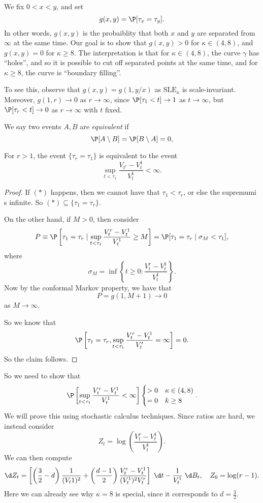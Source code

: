\documentclass[a4paper]{article}
\newcommand\SLE{\mathrm{SLE}}
\begin{document}
We fix $0 < x < y$, and set
\[
  g(x, y) =\P[\tau_x = \tau_y].
\]
In other words, $g(x, y)$ is the probaiblity that both $x$ and $y$ are separated from $\infty$ at the same time. Our goal is to show that $g(x, y) > 0$ for $\kappa \in (4, 8)$, and $g(x, y) = 0$ for $\kappa \geq 8$. The interpretation is that for $\kappa \in (4, 8)$, the curve $\gamma$ has ``holes'', and so it is possible to cut off separated points at the same time, and for $\kappa \geq 8$, the curve is ``boundary filling''.

To see this, observe that $g(x, y) = g(1, y/x)$ as $\SLE_\kappa$ is scale-invariant. Moreover, $g(1, r) \to 0$ as $r \to \infty$, since $\P[\tau_1 < t] \to 1$ as $t \to \infty$, but $\P[\tau_r < t] \to 0$ as $r \to \infty$ with $t$ fixed.

\begin{defi}
  We say two events $A, B$ are \emph{equivalent} if
  \[
    \P[A \setminus B] = \P[B \setminus A] = 0,
  \]
\end{defi}

\begin{prop}
  For $r > 1$, the event $\{\tau_r = \tau_1\}$ is equivalent to the event
  \[
    \sup_{t < \tau_1} \frac{V_{t^r} - V_t^1}{V_t^1} < \infty.\tag{$*$}
  \]
\end{prop}

\begin{proof}
  If $(*)$ happens, then we cannot have that $\tau_1 < \tau_r$, or else the supremumi s infinite. So $(*) \subseteq \{\tau_1 = \tau_r\}$.

  On the other hand, if $M > 0$, then consider
  \[
    P \equiv \P\left[\tau_1 = \tau_r \mid \sup_{t < \tau_1} \frac{V_t^r - V_t^1}{V_t^1} \geq M\right] = \P[\tau_1 = \tau_r \mid \sigma_M < \tau_1],
  \]
  where
  \[
    \sigma_M = \inf \left\{t \geq 0: \frac{V_t^r - V_t^1}{V_t^1}\right\}.
  \]
  Now by the conformal Markov property, we have that
  \[
    P = g(1, M + 1) \to 0
  \]
  as $M \to \infty$.

  So we know that
  \[
    \P\left[\tau_1 = \tau_r, \sup_{t < \tau_1} \frac{V_t^r - V_t^1}{V_t'} = \infty\right] = 0.
  \]
  So the claim follows.
\end{proof}

So we need to show that
\[
  \P\left[\sup_{t < \tau_1} \frac{V_t^r - V_t^1}{V_t^1} < \infty\right]
  \begin{cases}
    >0 & \kappa \in (4, 8)\\
    =0 & k \geq 8
  \end{cases}.
\]
We will prove this using stochastic calculus techniques. Since ratios are hard, we instead consider
\[
  Z_t = \log \left(\frac{V_t^r - V_t^1}{V_t^1}\right).
\]
We can then compute
\[
  \d Z_t = \left[\left(\frac{3}{2} - d\right)\frac{1}{(V_t1)^2} + \left(\frac{d - 1}{2}\right) \frac{V_t^r - V_t^1}{(V_t^1)^2 V_t^r}\right] \;\d t - \frac{1}{V_t^1} \;\d B_t,\quad Z_0 = \log (r - 1).
\]
Here we can already see why $\kappa = 8$ is special, since it corresponds to $d = \frac{3}{2}$.
\end{document}
